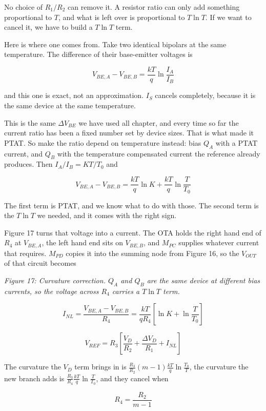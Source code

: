 No choice of \(R_1/R_2\) can remove it. A resistor ratio can only add
something proportional to \(T\), and what is left over is proportional
to \(T\ln{T}\). If we want to cancel it, we have to build a \(T\ln{T}\)
term.

Here is where one comes from. Take two identical bipolars at the same
temperature. The difference of their base-emitter voltages is

\[ V_{BE,A} - V_{BE,B} = \frac{kT}{q}\ln{\frac{I_A}{I_B}} \]

and this one is exact, not an approximation. \(I_S\) cancels completely,
because it is the same device at the same temperature.

This is the same \(\Delta V_{BE}\) we have used all chapter, and every
time so far the current ratio has been a fixed number set by device
sizes. That is what made it PTAT. So make the ratio depend on
temperature instead: bias \(Q_A\) with a PTAT current, and \(Q_B\) with
the temperature compensated current the reference already produces. Then
\(I_A/I_B = K T/T_0\) and

\[ V_{BE,A} - V_{BE,B} = \frac{kT}{q}\ln{K} + \frac{kT}{q}\ln{\frac{T}{T_0}} \]

The first term is PTAT, and we know what to do with those. The second
term is the \(T\ln{T}\) we needed, and it comes with the right sign.

Figure 17 turns that voltage into a current. The OTA holds the right
hand end of \(R_4\) at \(V_{BE,A}\), the left hand end sits on
\(V_{BE,B}\), and \(M_{PC}\) supplies whatever current that requires.
\(M_{PD}\) copies it into the summing node from Figure 16, so the
\(V_{OUT}\) of that circuit becomes


{
\centering
{}
}

\emph{Figure 17: Curvature correction. \(Q_A\) and \(Q_B\) are the same
device at different bias currents, so the voltage across \(R_4\) carries
a \(T\ln{T}\) term. }

\[ I_{NL} = \frac{V_{BE,A} - V_{BE,B}}{R_4} = \frac{kT}{qR_4}\left[\ln{K} + \ln{\frac{T}{T_0}}\right] \]

\[ V_{REF} = R_3\left[\frac{V_D}{R_2} + \frac{\Delta V_D}{R_1} + I_{NL}\right] \]

The curvature the \(V_D\) term brings in is
\(\frac{R_3}{R_2}(m-1)\frac{kT}{q}\ln{\frac{T_0}{T}}\), the curvature
the new branch adds is
\(\frac{R_3}{R_4}\frac{kT}{q}\ln{\frac{T}{T_0}}\), and they cancel when

\[ R_4 = \frac{R_2}{m-1} \]

